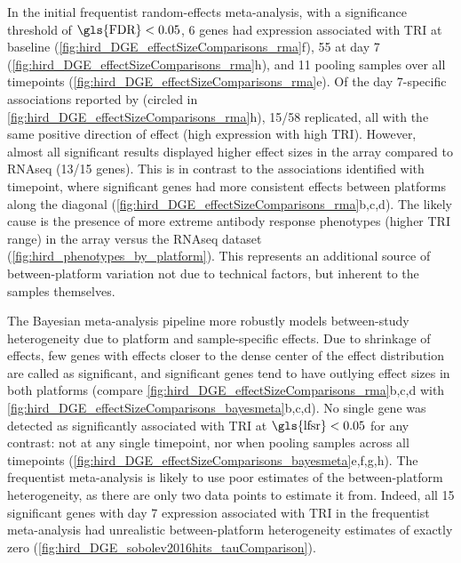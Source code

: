 In the initial frequentist random-effects meta-analysis,
with a significance threshold of $\text{\gls{FDR}} < 0.05$, 6 genes had expression associated with \gls{TRI} at baseline (\cref{fig:hird_DGE_effectSizeComparisons_rma}f), 55 at day 7 (\cref{fig:hird_DGE_effectSizeComparisons_rma}h), and 11 pooling samples over all timepoints (\cref{fig:hird_DGE_effectSizeComparisons_rma}e).
Of the day 7-specific associations reported by \textcite{sobolev2016AdjuvantedInfluenzaH1N1Vaccination} (circled in \cref{fig:hird_DGE_effectSizeComparisons_rma}h), 
15/58 replicated, all with the same positive direction of effect (high expression with high \gls{TRI}).
However, almost all significant results displayed higher effect sizes in the array compared to \gls{RNAseq} (13/15 genes).
This is in contrast to the associations identified with timepoint, where significant genes had more consistent effects between platforms along the diagonal (\cref{fig:hird_DGE_effectSizeComparisons_rma}b,c,d).
The likely cause is the presence of more extreme antibody response phenotypes (higher \gls{TRI} range) in the array versus the \gls{RNAseq} dataset (\cref{fig:hird_phenotypes_by_platform}).
This represents an additional source of between-platform variation not due to technical factors, but inherent to the samples themselves.

The Bayesian meta-analysis pipeline more robustly models between-study heterogeneity due to platform and sample-specific effects. 
Due to shrinkage of effects, few genes with effects closer to the dense center of the effect distribution are called as significant, and significant genes tend to have outlying effect sizes in both platforms (compare \cref{fig:hird_DGE_effectSizeComparisons_rma}b,c,d with \cref{fig:hird_DGE_effectSizeComparisons_bayesmeta}b,c,d).
No single gene was detected as significantly associated with \gls{TRI} at $\text{\gls{lfsr}} < 0.05$ for any contrast:
not at any single timepoint, nor when pooling samples across all timepoints (\cref{fig:hird_DGE_effectSizeComparisons_bayesmeta}e,f,g,h).
The frequentist meta-analysis is likely to use poor estimates of the between-platform heterogeneity, as there are only two data points to estimate it from.
Indeed, all 15 significant genes with day 7 expression associated with \gls{TRI} in the frequentist meta-analysis
had unrealistic between-platform heterogeneity estimates of exactly zero (\cref{fig:hird_DGE_sobolev2016hits_tauComparison}).

